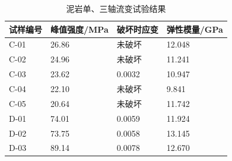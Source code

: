 \begin{table}[ht!]\small
    \begin{tabular}{p{3cm}<{\centering} p{3cm}<{\centering} p{3cm}<{\centering} p{3cm}<{\centering}}
        \toprule
        试样编号  & 峰值强度/MPa  &  破坏时应变   & 弹性模量/GPa\\
        \midrule
        C-01        & 26.86  &   未破坏  &  12.048   \\ 
        C-02        & 24.96 &   未破坏  &  11.241   \\ 
        C-03        & 23.62  &   0.0032  &  10.947  \\ 
        C-04        & 22.10 &   未破坏  &  9.841   \\ 
        C-05        & 20.64  &   未破坏  &  11.742  \\
        \midrule
        D-01        & 74.01  &   0.0059  &  11.924    \\ 
        D-02        & 73.75 &   0.0058 &  13.145    \\ 
        D-03        & 89.14 &   0.0078  &  12.670 \\ 
        \bottomrule
    \end{tabular}
    \caption{泥岩单、三轴流变试验结果}
    \label{tab:泥岩单、三轴流变试验结果}
\end{table}

